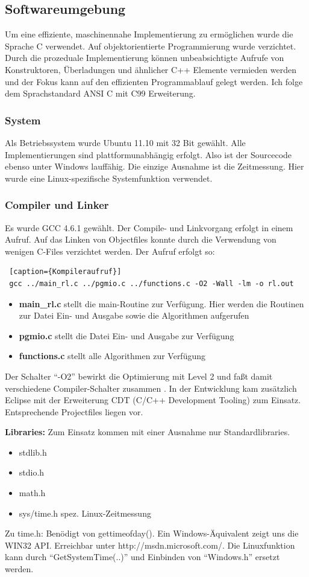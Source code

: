 \documentclass[a4paper,12pt]{article}
\begin{document}
\subsection{Softwareumgebung}
Um eine effiziente, maschinennahe Implementierung zu ermöglichen wurde die
Sprache C verwendet. Auf objektorientierte Programmierung wurde verzichtet.
Durch die prozeduale Implementierung können unbeabsichtigte Aufrufe von
Konstruktoren, Überladungen und ähnlicher C++ Elemente vermieden werden und der
Fokus kann auf den effizienten Programmablauf gelegt werden. Ich folge dem
Sprachstandard ANSI C mit C99 Erweiterung.
\subsubsection{System}
Als Betriebssystem wurde Ubuntu 11.10 mit 32 Bit gewählt. Alle Implementierungen
sind plattformunabhängig erfolgt. Also ist der Sourcecode ebenso unter Windows
lauffähig. Die einzige Ausnahme ist die Zeitmessung. Hier wurde eine
Linux-spezifische Systemfunktion verwendet.
\subsubsection{Compiler und Linker}
Es wurde GCC 4.6.1 gewählt. Der Compile- und Linkvorgang erfolgt in einem
Aufruf.
Auf das Linken von Objectfiles konnte durch die Verwendung von wenigen C-Files
verzichtet werden. Der Aufruf erfolgt so:
\begin{lstlisting} [caption={Kompileraufruf}]
 gcc ../main_rl.c ../pgmio.c ../functions.c -O2 -Wall -lm -o rl.out
\end{lstlisting}
\begin{itemize}
  \itemsep -1pt  
\item \textbf{main\_rl.c} stellt die main-Routine zur Verfügung. Hier werden die
Routinen zur Datei Ein- und Ausgabe sowie die Algorithmen aufgerufen
\item \textbf{pgmio.c} stellt die Datei Ein- und Ausgabe zur Verfügung
\item \textbf{functions.c} stellt alle Algorithmen zur Verfügung
\end{itemize}
Der Schalter "`-O2"' bewirkt die Optimierung mit Level 2 und faßt damit
verschiedene Compiler-Schalter zusammen \cite{gcc}.
In der Entwicklung kam zusätzlich Eclipse mit der Erweiterung CDT (C/C++
Development Tooling) zum Einsatz. Entsprechende Projectfiles liegen vor.

\textbf{Libraries:} Zum Einsatz kommen mit einer Ausnahme nur Standardlibraries.
\begin{itemize} 
  \itemsep -1pt 
  \item stdlib.h
  \item	stdio.h
  \item	math.h
  \item sys/time.h spez. Linux-Zeitmessung
\end{itemize}
Zu time.h: Benödigt von gettimeofday(). Ein Windows-Äquivalent zeigt uns die
WIN32 API. Erreichbar unter http://msdn.microsoft.com/. Die Linuxfunktion kann
durch "`GetSystemTime(..)"' und Einbinden von "`Windows.h"' ersetzt werden.
\end{document}
